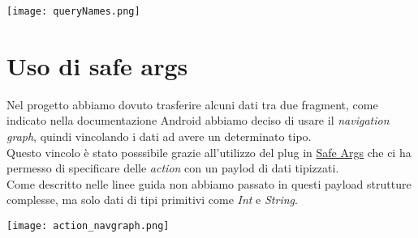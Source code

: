 \documentclass[../Assignment-3-LPSMT.tex]{subfiles}
\begin{document}
\begin{center}
  \texttt{[image: queryNames.png]}
\end{center}

\section{Uso di safe args}

Nel progetto abbiamo dovuto trasferire alcuni dati tra due fragment, come indicato nella documentazione Android abbiamo deciso di usare il \emph{navigation graph}, quindi vincolando i dati ad avere un determinato tipo.\\
Questo vincolo è stato posssibile grazie all'utilizzo del plug in \href{https://developer.android.com/guide/navigation/use-graph/pass-data#Safe-args}{Safe Args} che ci ha permesso di specificare delle \emph{action} con un paylod di dati tipizzati.\\
Come descritto nelle linee guida non abbiamo passato in questi payload strutture complesse, ma solo dati di tipi primitivi come \emph{Int} e \emph{String}.

\begin{center}
  \texttt{[image: action\_navgraph.png]}
\end{center}
\end{document}
